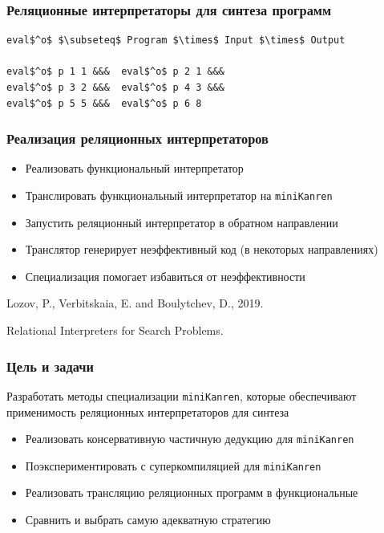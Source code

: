 \documentclass{beamer}
\newcommand{\miniKanren}{\texttt{miniKanren}\xspace}
\begin{document}
\begin{frame}[fragile]
  \frametitle{Реляционные интерпретаторы для синтеза программ}

  \begin{center}
    \begin{minipage}{6.2cm}
    \begin{lstlisting}[frame=single]
eval$^o$ $\subseteq$ Program $\times$ Input $\times$ Output

eval$^o$ p 1 1 &&&  eval$^o$ p 2 1 &&&
eval$^o$ p 3 2 &&&  eval$^o$ p 4 3 &&&
eval$^o$ p 5 5 &&&  eval$^o$ p 6 8
    \end{lstlisting}
    \end{minipage}
    \end{center}
\end{frame}


\begin{frame}[fragile]
  \frametitle{Реализация реляционных
  интерпретаторов}
  \begin{itemize}
    \item Реализовать функциональный интерпретатор
    \item Транслировать функциональный интерпретатор на \miniKanren
    \item Запустить реляционный интерпретатор в обратном направлении
  \end{itemize}

  \vfill

  \begin{itemize}
    \item Транслятор генерирует неэффективный код (в некоторых направлениях)
    \item Специализация помогает избавиться от неэффективности
  \end{itemize}

  \vfill

  \begin{center}
    Lozov, P., Verbitskaia, E. and Boulytchev, D., 2019.

    Relational Interpreters for Search Problems.
\end{center}

\end{frame}

\begin{frame}[fragile]
  \frametitle{Цель и задачи}

\begin{center}
  Разработать методы специализации \miniKanren, которые обеспечивают применимость реляционных интерпретаторов для синтеза
\end{center}

\begin{itemize}
  \item Реализовать консервативную частичную дедукцию для \miniKanren
  \item Поэкспериментировать с суперкомпиляцией для \miniKanren
  \item Реализовать трансляцию реляционных программ в функциональные
  \item Сравнить и выбрать самую адекватную стратегию
\end{itemize}
\end{frame}
\end{document}
